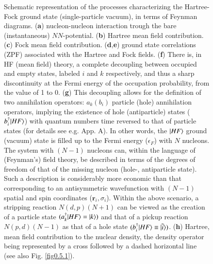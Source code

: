 \begin{figure}[h!]
	\caption{ Schematic representation of the processes characterizing the Hartree-Fock ground state (single-particle vacuum), in terms of Feynman diagrams. (\textbf{a}) nucleon-nucleon interaction trough the bare (instantaneous) $NN$-potential. (\textbf{b}) Hartree mean field contribution. (\textbf{c}) Fock mean field contribution. (\textbf{d},\textbf{e}) ground state correlations (ZPF) associated with the Hartree and Fock fields. (\textbf{f}) There is, in HF (mean field) theory, a complete decoupling between occupied and empty states, labeled $i$ and $k$ respectively, and thus a sharp discontinuity at the Fermi energy of the occupation probability, from the value of 1 to 0. (\textbf{g}) This decoupling allows for the definition of two annihilation operators: $a_k(b_i)$ particle (hole) annihilation operators,   implying the existence of hole (antiparticle) states ($b^\dagger_i|{HF} \rangle$) with quantum numbers time reversed to that of particle states (for details see e.g. \cite{Brink:05} App. A). In other words, the $|{HF} \rangle$ ground (vacuum) state is filled up to the Fermi energy ($\epsilon_F$) with $N$ nucleons. The system with $(N-1)$ nucleons can, within the language of (Feynman's) field theory, be described in terms of the degrees of freedom of that of the missing nucleon (hole-, antiparticle state). Such a description is  considerably more economic than that corresponding to an antisymmetric wavefunction with $(N-1)$ spatial and spin coordinates ($\mathbf r_i,\sigma_i$). Within the above scenario, a stripping reaction $N(d,p)(N+1)$ can be viewed as the creation of a particle state $(a^\dagger_k|{HF} \rangle=|{k} \rangle)$ and that of a pickup reaction $N(p,d)(N-1)$ as that of a hole state $(b^\dagger_i|{HF} \rangle\equiv|{\tilde i} \rangle)$. (\textbf{h}) Hartree, mean field contribution to the  nuclear density, the density operator being represented by a cross followed by a dashed horizontal line (see also Fig. \ref{fig0.5.1}).}
	\label{fig1.0.6}
\end{figure}
